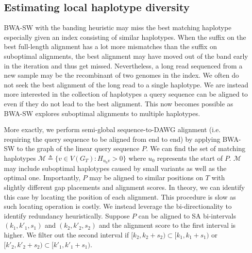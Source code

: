 \documentclass[webpdf,contemporary,large,namedate]{oup-authoring-template}%
\begin{document}

\subsection{Estimating local haplotype diversity}

BWA-SW with the banding heuristic may miss the best matching haplotype especially given an index consisting of similar haplotypes.
When the suffix on the best full-length alignment has a lot more mismatches than the suffix on suboptimal alignments,
the best alignment may have moved out of the band early in the iteration and thus get missed.
Nevertheless, a long read sequenced from a new sample may be the recombinant of two genomes in the index.
We often do not seek the best alignment of the long read to a single haplotype.
We are instead more interested in the collection of haplotypes a query sequence can be aligned to even if they do not lead to the best alignment.
This now becomes possible as BWA-SW explores suboptimal alignments to multiple haplotypes.

More exactly, we perform semi-global sequence-to-DAWG alignment (i.e. requiring the query sequence to be aligned from end to end)
by applying BWA-SW to the graph of the linear query sequence $P$.
We can find the set of matching haplotypes $\mathcal{M}\triangleq\{v\in V(G_T):H_{u_0v}>0\}$ where $u_0$ represents the start of $P$.
$\mathcal{M}$ may include suboptimal haplotypes caused by small variants as well as the optimal one.
Importantly, $P$ may be aligned to similar positions on $T$ with slightly different gap placements and alignment scores.
In theory, we can identify this case by locating the position of each alignment.
This procedure is slow as such locating operation is costly.
We instead leverage the bi-directionality to identify redundancy heuristically.
Suppose $P$ can be aligned to SA bi-intervals $(k_1,k'_1,s_1)$ and $(k_2,k'_2,s_2)$ and the alignment score to the first interval is higher.
We filter out the second interval if $[k_2,k_2+s_2)\subset[k_1,k_1+s_1)$ or $[k'_2,k'_2+s_2)\subset[k'_1,k'_1+s_1)$.
\end{document}
